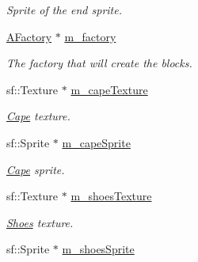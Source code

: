 \begin{DoxyCompactItemize}
\begin{DoxyCompactList}\small\item\em Sprite of the end sprite. \end{DoxyCompactList}\item 
\hypertarget{class_level_one_a5deb2f4f9868a5b42ac0bfb40c75a491}{\hyperlink{class_a_factory}{A\-Factory} $\ast$ \hyperlink{class_level_one_a5deb2f4f9868a5b42ac0bfb40c75a491}{m\-\_\-factory}}\label{class_level_one_a5deb2f4f9868a5b42ac0bfb40c75a491}

\begin{DoxyCompactList}\small\item\em The factory that will create the blocks. \end{DoxyCompactList}\item 
\hypertarget{class_level_one_acd38cdd140a62b23bf0b3c5e8541f64b}{sf\-::\-Texture $\ast$ \hyperlink{class_level_one_acd38cdd140a62b23bf0b3c5e8541f64b}{m\-\_\-cape\-Texture}}\label{class_level_one_acd38cdd140a62b23bf0b3c5e8541f64b}

\begin{DoxyCompactList}\small\item\em \hyperlink{class_cape}{Cape} texture. \end{DoxyCompactList}\item 
\hypertarget{class_level_one_af5d368ef0e5ea3d07fb16c8a69703a1c}{sf\-::\-Sprite $\ast$ \hyperlink{class_level_one_af5d368ef0e5ea3d07fb16c8a69703a1c}{m\-\_\-cape\-Sprite}}\label{class_level_one_af5d368ef0e5ea3d07fb16c8a69703a1c}

\begin{DoxyCompactList}\small\item\em \hyperlink{class_cape}{Cape} sprite. \end{DoxyCompactList}\item 
\hypertarget{class_level_one_ab9c32a3bf770e78491cef9198c4390b2}{sf\-::\-Texture $\ast$ \hyperlink{class_level_one_ab9c32a3bf770e78491cef9198c4390b2}{m\-\_\-shoes\-Texture}}\label{class_level_one_ab9c32a3bf770e78491cef9198c4390b2}

\begin{DoxyCompactList}\small\item\em \hyperlink{class_shoes}{Shoes} texture. \end{DoxyCompactList}\item 
\hypertarget{class_level_one_ac64de7544f6d905ee5c9582d65bc5409}{sf\-::\-Sprite $\ast$ \hyperlink{class_level_one_ac64de7544f6d905ee5c9582d65bc5409}{m\-\_\-shoes\-Sprite}}\label{class_level_one_ac64de7544f6d905ee5c9582d65bc5409}


\end{DoxyCompactItemize}
